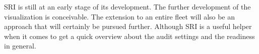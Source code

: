 \thispagestyle{plain}
SRI is still at an early stage of its development. The further development of the visualization is conceivable. The extension to an entire fleet will also be an approach that will certainly be pursued further. Although SRI is a useful helper when it comes to get a quick overview about the audit settings and the readiness in general.



\renewcommand\section{\clearpage\stdsection}